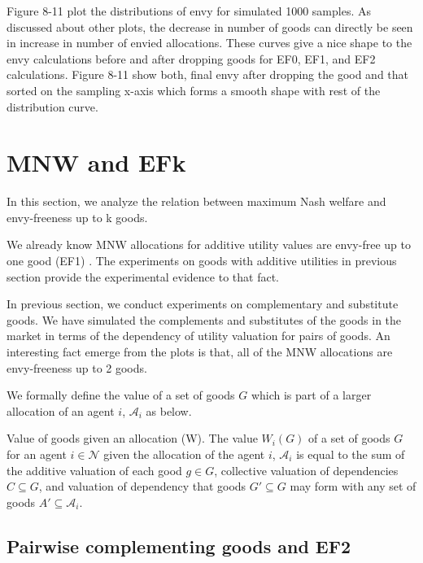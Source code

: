 Figure 8-11 plot the distributions of envy for simulated 1000 samples. As discussed about other plots, the decrease in number of goods can directly be seen in increase in number of envied allocations. These curves give a nice shape to the envy calculations before and after dropping goods for EF0, EF1, and EF2 calculations. Figure 8-11 show both, final envy after dropping the good and that sorted on the sampling x-axis which forms a smooth shape with rest of the distribution curve.


\section{MNW and EFk}
\label{section_proof}

In this section, we analyze the relation between maximum Nash welfare and envy-freeness up to k goods.

We already know MNW allocations for additive utility values are envy-free up to one good (EF1) \cite{caragiannis2016unreasonable}. The experiments on goods with additive utilities in previous section provide the experimental evidence to that fact.

In previous section, we conduct experiments on complementary and substitute goods. We have simulated the complements and substitutes of the goods in the market in terms of the dependency of utility valuation for pairs of goods. An interesting fact emerge from the plots is that, all of the MNW allocations are envy-freeness up to 2 goods.

We formally define the value of a set of goods $G$ which is part of a larger allocation of an agent $i$, $\mathcal{A}_i$ as below.

\begin{definition}{Value of goods given an allocation (W).}
\label{def_dep_value}
The value $W_i(G)$ of a set of goods $G$ for an agent $i \in \mathcal{N}$ given the allocation of the agent $i$, $\mathcal{A}_i$ is equal to the sum of the additive valuation of each good $g \in G$, collective valuation of dependencies $C \subseteq G$, and valuation of dependency that goods $G' \subseteq G$ may form with any set of goods $A' \subseteq \mathcal{A}_i$.
\end{definition}

\subsection{Pairwise complementing goods and EF2}
\label{subsection_EF2_compl}

